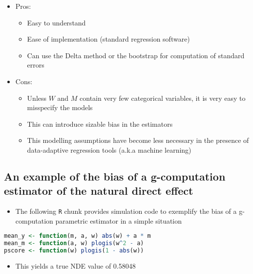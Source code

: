 \documentclass[
  12pt,
]{book}
\newcommand{\passthrough}[1]{#1}
\providecommand{\tightlist}{%
  \setlength{\itemsep}{0pt}\setlength{\parskip}{0pt}}
\theoremstyle{definition}
\theoremstyle{definition}
\theoremstyle{definition}
\newcommand{\1}{\mathbbm{1}}
\begin{document}
\begin{itemize}
\tightlist
\item
  Pros:

  \begin{itemize}
  \tightlist
  \item
    Easy to understand
  \item
    Ease of implementation (standard regression software)
  \item
    Can use the Delta method or the bootstrap for computation of standard errors
  \end{itemize}
\item
  Cons:

  \begin{itemize}
  \tightlist
  \item
    Unless \(W\) and \(M\) contain very few categorical variables, it is very easy
    to misspecify the models
  \item
    This can introduce sizable bias in the estimators
  \item
    This modelling assumptions have become less necessary in the presence of data-adaptive regression tools (a.k.a machine learning)
  \end{itemize}
\end{itemize}

\hypertarget{an-example-of-the-bias-of-a-g-computation-estimator-of-the-natural-direct-effect}{%
\subsection{An example of the bias of a g-computation estimator of the natural direct effect}\label{an-example-of-the-bias-of-a-g-computation-estimator-of-the-natural-direct-effect}}

\begin{itemize}
\tightlist
\item
  The following \passthrough{\lstinline!R!} chunk provides simulation code to exemplify the bias of a
  g-computation parametric estimator in a simple situation
\end{itemize}

\begin{lstlisting}[language=R]
mean_y <- function(m, a, w) abs(w) + a * m
mean_m <- function(a, w) plogis(w^2 - a)
pscore <- function(w) plogis(1 - abs(w))
\end{lstlisting}

\begin{itemize}
\tightlist
\item
  This yields a true NDE value of 0.58048
\end{itemize}
\end{document}
